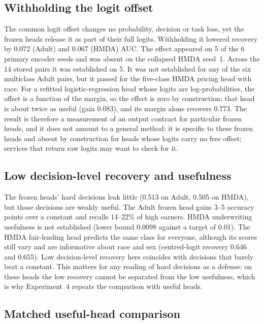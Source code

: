 \documentclass[10pt]{article}
\begin{document}
\subsection{Withholding the logit offset}\label{sec:offset}

The common logit offset changes no probability, decision or task loss, yet the frozen heads release it as part of their
full logits. Withholding it lowered recovery by 0.072 (Adult) and 0.067 (HMDA) AUC. The effect appeared on 5 of the 6
primary encoder seeds and was absent on the collapsed HMDA seed~1. Across the 14 stored pairs it was established on 5.
It was not established for any of the six multiclass Adult pairs, but it passed for the five-class HMDA pricing head with
race. For a refitted logistic-regression head whose logits are log-probabilities, the offset is a function of the
margin, so the effect is zero by construction; that head is about twice as useful (gain 0.083), and its margin alone
recovers 0.773. The result is therefore a measurement of an output contract for particular frozen heads, and it does not
amount to a general method: it is specific to these frozen heads and absent by construction for heads whose logits carry no free offset; services
that return raw logits may want to check for it.

\subsection{Low decision-level recovery and usefulness}\label{sec:frozen}

The frozen heads' hard decisions leak little (0.513 on Adult, 0.505 on HMDA), but those decisions are weakly useful. The
Adult frozen head gains 3--5 accuracy points over a constant and recalls 14--22\% of high earners. HMDA underwriting
usefulness is not established (lower bound 0.0098 against a target of 0.01). The HMDA fair-lending head predicts the
same class for everyone, although its scores still vary and are informative about race and sex (centred-logit recovery
0.646 and 0.655). Low decision-level recovery here coincides with decisions that barely beat a constant. This matters
for any reading of hard decisions as a defense: on these heads the low recovery cannot be separated from the low
usefulness, which is why Experiment~4 repeats the comparison with useful heads.

\subsection{Matched useful-head comparison}\label{sec:useful}
\end{document}
